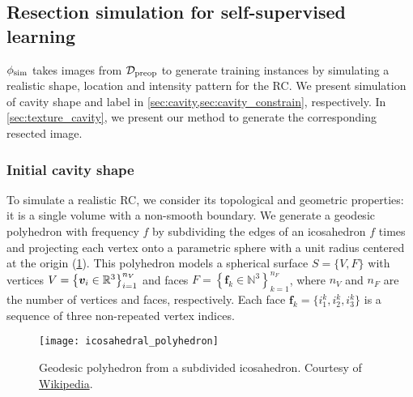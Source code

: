 \subsection{Resection simulation for self-supervised learning}
\label{sec:simulation}

\newcommand{\AAA}{\bm{A}}
\newcommand{\NN}{\mathcal{N}}


$\phi_{\text{sim}}$ takes images from $\mathcal{D}_{\text{preop}}$ to generate training instances by simulating a realistic shape, location and intensity pattern for the \ac{RC}.
We present simulation of cavity shape and label in \cref{sec:cavity,sec:cavity_constrain}, respectively.
In \cref{sec:texture_cavity}, we present our method to generate the corresponding resected image.


\subsubsection{Initial cavity shape}
\label{sec:cavity}

To simulate a realistic \ac{RC}, we consider its topological and geometric properties: it is a single volume with a non-smooth boundary.
We generate a geodesic polyhedron with frequency $f$ by subdividing the edges of an icosahedron $f$ times and projecting each vertex onto a parametric sphere with a unit radius centered at the origin (\cref{fig:icosahedron}).
This polyhedron models a spherical surface $S = \{ V, F \}$ with vertices
$
  V = \left\{
    \bm{v}_i \in \mathbb{R}^3
  \right\}
  _{i = 1}^{n_V}
$
and faces
$
  F = \left\{
    \bm{f}_k \in \mathbb{N}^3
  \right\}
  _{k = 1}^{n_F}
$, where $n_V$ and $n_F$ are the number of vertices and faces, respectively.
%
Each face $\bm{f}_k = \{ i_1^k, i_2^k, i_3^k \}$ is a sequence of three non-repeated vertex indices.

\begin{figure}
  \centering
  \texttt{[image: icosahedral\_polyhedron]}
  \caption[Geodesic polyhedron from a subdivided icosahedron]{
    Geodesic polyhedron from a subdivided icosahedron.
    Courtesy of \href{https://en.wikipedia.org/wiki/Geodesic_polyhedron}{Wikipedia}.
  }
  \label{fig:icosahedron}
\end{figure}

